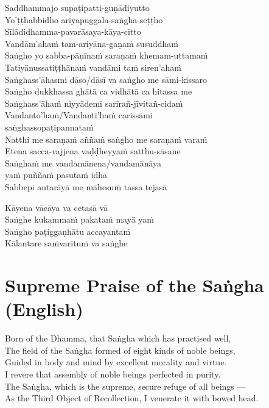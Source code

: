 \begin{leader}
\end{leader}

Saddhammajo supaṭipatti-guṇādiyutto\\
Yo'ṭṭhabbidho ariyapuggala-saṅgha-seṭṭho\\
Sīlādidhamma-pavarāsaya-kāya-citto\\
Vandām'ahaṁ tam-ariyāna-gaṇaṁ susuddhaṁ\\
Saṅgho yo sabba-pāṇīnaṁ saraṇaṁ khemam-uttamaṁ\\
Tatiyānussatiṭṭhānaṁ vandāmi taṁ siren'ahaṁ\\
Saṅghass'āhasmi dāso/dāsī va saṅgho me sāmi-kissaro\\
Saṅgho dukkhassa ghātā ca vidhātā ca hitassa me\\
Saṅghass'āhaṁ niyyādemi sarīrañ-jīvitañ-cidaṁ\\
Vandanto'haṁ/Vandantī'haṁ carissāmi\\
\vin saṅghassopaṭipannataṁ\\
Natthi me saraṇaṁ aññaṁ saṅgho me saraṇaṁ varaṁ\\
Etena sacca-vajjena vaḍḍheyyaṁ satthu-sāsane\\
Saṅghaṁ me vandamānena/vandamānāya\\
\vin yaṁ puññaṁ pasutaṁ idha\\
Sabbepi antarāyā me māhesuṁ tassa tejasā


Kāyena vācāya va cetasā vā\\
Saṅghe kukammaṁ pakataṁ mayā yaṁ\\
Saṅgho paṭiggaṇhātu accayantaṁ\\
Kālantare saṁvarituṁ va saṅghe

\section*{Supreme Praise of the Saṅgha (English)}

\begin{leader}
\end{leader}

Born of the Dhamma, that Saṅgha which has practised well,\\
The field of the Saṅgha formed of eight kinds of noble beings,\\
Guided in body and mind by excellent morality and virtue.\\
I revere that assembly of noble beings perfected in purity.\\
The Saṅgha, which is the supreme, secure refuge of all beings ---\\
As the Third Object of Recollection, I venerate it with bowed head.

